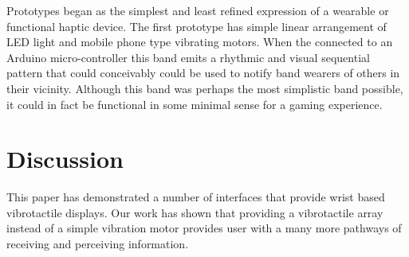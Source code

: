 \documentclass{chi-ext}
\begin{document}

Prototypes began as the simplest and least refined expression of a wearable or functional haptic device. The first prototype has simple linear arrangement of LED light and mobile phone type vibrating motors. When the connected to an Arduino micro-controller this band emits a rhythmic and visual sequential pattern that could conceivably could be used to notify band wearers of others in their vicinity. Although this band was perhaps the most simplistic band possible, it could in fact be functional in some minimal sense for a gaming experience. 


\section{Discussion}
This paper has demonstrated a number of interfaces that provide wrist based vibrotactile displays. Our work has shown that providing a vibrotactile array instead of a simple vibration motor provides user with a many more pathways of receiving and perceiving information.
\end{document}
